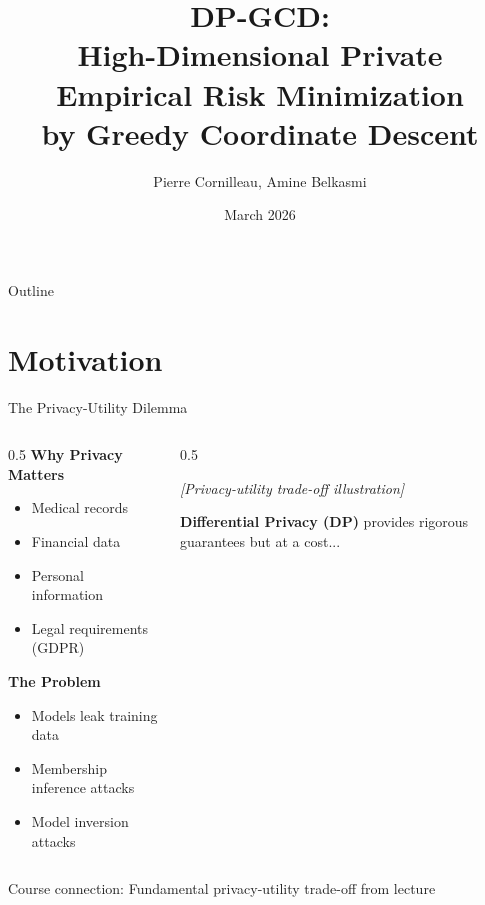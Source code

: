 \documentclass{beamer}
\title{DP-GCD:\\High-Dimensional Private Empirical Risk Minimization\\by Greedy Coordinate Descent}
\author{Pierre Cornilleau, Amine Belkasmi}
\institute{Differential Privacy in ML project}
\date{March 2026}
\begin{document}
\frame{\titlepage}

\begin{frame}{Outline}
\tableofcontents
\end{frame}

\section{Motivation}

\begin{frame}{The Privacy-Utility Dilemma}
\begin{columns}[T]
\begin{column}{0.5\textwidth}
\textbf{Why Privacy Matters}
\begin{itemize}
\item Medical records
\item Financial data
\item Personal information
\item Legal requirements (GDPR)
\end{itemize}

\vspace{1em}

\textbf{The Problem}
\begin{itemize}
\item Models leak training data
\item Membership inference attacks
\item Model inversion attacks
\end{itemize}
\end{column}

\begin{column}{0.5\textwidth}
\begin{center}
\textit{[Privacy-utility trade-off illustration]}
\end{center}

\vspace{0.5em}

\textbf{Differential Privacy (DP)} provides rigorous guarantees but at a cost...
\end{column}
\end{columns}

\vspace{0.5em}

\alert{Course connection:} Fundamental privacy-utility trade-off from lecture
\end{frame}
\end{document}
